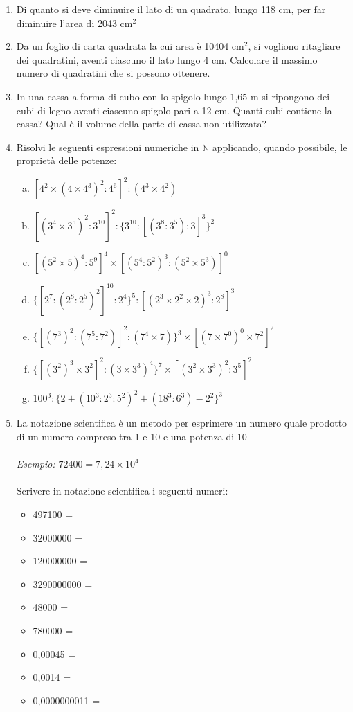\documentclass[]{article}
\newcommand*\result[1] {\hspace*{0em plus 1fill}{\footnotesize \makebox{[#1]}}}
\begin{document}
\begin{enumerate}
	\item {Di quanto si deve diminuire il lato di un quadrato, lungo 118 cm, per far diminuire l'area di 2043 cm\(^2\)} \result{9 cm}
	
	\item {Da un foglio di carta quadrata la cui area è 10404 cm\(^2\), si vogliono ritagliare dei quadratini, aventi ciascuno il lato lungo 4 cm. Calcolare il massimo numero di quadratini che si possono ottenere.} \result{625}
	
	\item {In una cassa a forma di cubo con lo spigolo lungo 1,65 m si ripongono dei cubi di legno aventi ciascuno spigolo pari a 12 cm. Quanti cubi contiene la cassa? Qual è il volume della parte di cassa non utilizzata?} \result{2197; 696 cm\(^3\)}
	
	\item {Risolvi le seguenti espressioni numeriche in \(\mathbb{N}\) applicando, quando possibile, le proprietà delle potenze:
		\begin{enumerate}[a.]
			\item \([4^2\times(4\times4^3)^2:4^6]^2:(4^3\times4^2) \) \result{\(4^3\)}
			\item \([(3^4\times3^5)^2:3^{10}]^2:\{3^{10}:[(3^8:3^5):3]^3\}^2\) \result{\(3^8\)}
			\item \([(5^2\times5)^4:5^9]^4\times[(5^4:5^2)^3:(5^2\times5^3)]^0\) \result{\(5^{12}\)}
			\item \(\{[2^7:(2^8:2^5)^2]^{10}:2^4\}^5:[(2^3\times2^2\times2)^3:2^8]^3\) \result{1}
			\item \(\{[(7^3)^2:(7^5:7^2)]^2:(7^4\times7)\}^3\times[(7\times7^0)^0\times7^2]^2\) \result{\(7^7\)}
			\item \(\{[(3^2)^3\times3^2]^2:(3\times3^3)^4\}^7\times[(3^2\times3^3)^2:3^5]^2\) \result{\(3^{10}\)}
			\item \(100^3:\{2 +(10^3:2^3:5^{2})^2+(18^3:6^3)-2^2\}^3\) \result{8}
		\end{enumerate}
	}

	\item {La notazione scientifica è un metodo per esprimere un numero quale prodotto di un numero compreso tra 1 e 10 e una potenza di 10 \\ \\ \textit{Esempio: } \(72400 = 7,24 \times 10^4\) \\ \\ Scrivere in notazione scientifica i seguenti numeri:
	\begin{itemize}
			\item 497100 =
			\item 32000000 =
			\item 120000000 =
			\item 3290000000 =
			\item 48000 =
			\item 780000 =
			\item 0,00045 =
			\item 0,0014 =
			\item 0,0000000011 = 
	\end{itemize}
	}


\end{enumerate}
\end{document}
